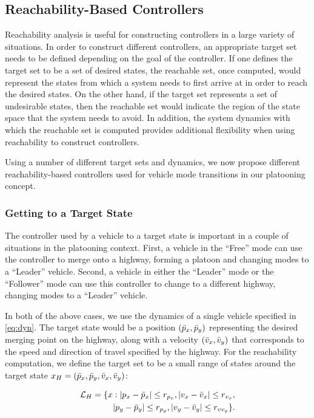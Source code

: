 \subsection{Reachability-Based Controllers \label{sec:reach_ctrl}}
Reachability analysis is useful for constructing controllers in a large variety of situations. In order to construct different controllers, an appropriate target set needs to be defined depending on the goal of the controller. If one defines the target set to be a set of desired states, the reachable set, once computed, would represent the states from which a system needs to first arrive at in order to reach the desired states. On the other hand, if the target set represents a set of undesirable states, then the reachable set would indicate the region of the state space that the system needs to avoid. In addition, the system dynamics with which the reachable set is computed provides additional flexibility when using reachability to construct controllers.

Using a number of different target sets and dynamics, we now propose different reachability-based controllers used for vehicle mode transitions in our platooning concept.

\subsubsection{Getting to a Target State \label{sec:abs_target_ctrl}}
The controller used by a vehicle to a target state is important in a couple of situations in the platooning context. First, a vehicle in the ``Free'' mode can use the controller to merge onto a highway, forming a platoon and changing modes to a ``Leader'' vehicle. Second, a vehicle in either the ``Leader'' mode or the ``Follower'' mode can use this controller to change to a different highway, changing modes to a ``Leader'' vehicle. 

In both of the above cases, we use the dynamics of a single vehicle specified in \ref{eq:dyn}. The target state would be a position $(\bar{p}_x, \bar{p}_y)$ representing the desired merging point on the highway, along with a velocity $(\bar{v}_x, \bar{v}_y)$ that corresponds to the speed and direction of travel specified by the highway. For the reachability computation, we define the target set to be a small range of states around the target state $x_H = (\bar{p}_x, \bar{p}_y, \bar{v}_x, \bar{v}_y)$:

\begin{equation}
\begin{aligned}
\mathcal{L}_H = \{x: |p_x-\bar{p}_x|\le r_{p_x}, |v_x-\bar{v}_x|\le r_{v_x}, \\
|p_y - \bar{p}_y| \le r_{p_y}, |v_y - \bar{v}_y|\le r_{vv_y} \}.
\end{aligned}
\end{equation}

